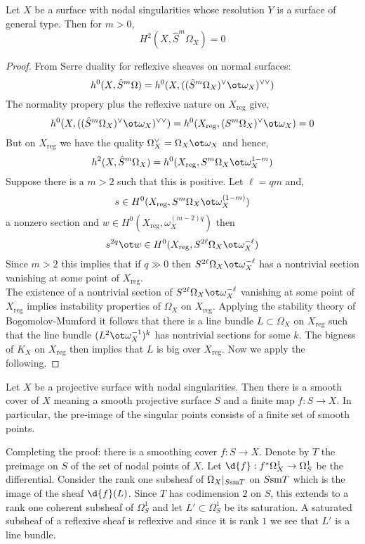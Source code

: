 \documentclass[12pt]{article}
\begin{document}
\newcommand{\reg}{\mathrm{reg}}

\begin{prop}
Let $X$ be a surface with nodal singularities whose resolution $Y$ is a surface of general type. Then for $m > 0$,
\[ H^2(X, \hat{S}^m \Omega_X) = 0 \]
\end{prop}

\begin{proof}
From Serre duality for reflexive sheaves on normal surfaces:
\[ h^0(X, \hat{S}^m \Omega) = h^0(X, ((\hat{S}^m \Omega_X)^\vee \ot \omega_X)^{\vee \vee}) \]
The normality propery plus the reflexive nature on $X_{\reg}$ give,
\[ h^0(X, ((\hat{S}^m \Omega_X)^\vee \ot \omega_X)^{\vee \vee}) = h^0(X_{\reg}, (S^m \Omega_X)^\vee \ot \omega_X) = 0 \]
But on $X_{\reg}$ we have the quality $\Omega_X^\vee = \Omega_X \ot \omega_X$ and hence,
\[ h^2(X, \hat{S}^m \Omega_X) = h^0(X_{\reg}, S^m \Omega_X \ot \omega_X^{1-m}) \]
Suppose there is a $m > 2$ such that this is positive. Let $\ell = qm$ and,
\[ s \in H^0(X_{\reg}, S^m \Omega_X \ot \omega_X^{(1 - m)}) \]
a nonzero section and $w \in H^0(X_{\reg}, \omega_X^{(m-2)q})$ then
\[ s^{2q} \ot w \in H^0(X_{\reg}, S^{2 \ell} \Omega_X \ot \omega_X^{-\ell}) \]
Since $m > 2$ this implies that if $q \gg 0$ then $S^{2 \ell} \Omega_X \ot \omega_X^{-\ell}$ has a nontrivial section vanishing at some point of $X_{\reg}$. 
\bigskip\\
The existence of a nontrivial section of $S^{2 \ell} \Omega_X \ot \omega_X^{-\ell}$ vanishing at some point of $X_{\reg}$ implies instability properties of $\Omega_X$ on $X_{\reg}$. Applying the stability theory of Bogomolov-Mumford it follows that there is a line bundle $L \subset \Omega_X$ on $X_{\reg}$ such that the line bundle $(L^2 \ot \omega_X^{-1})^k$ has nontrivial sections for some $k$. The bigness of $K_X$ on $X_{\reg}$ then implies that $L$ is big over $X_{\reg}$. Now we apply the following.
\end{proof}

\begin{lemma}
Let $X$ be a projective surface with nodal singularities. Then there is a smooth cover of $X$ meaning a smooth projective surface $S$ and a finite map $f : S \to X$. In particular, the pre-image of the singular points consists of a finite set of smooth points. 
\end{lemma}


Completing the proof: there is a smoothing cover $f : S \to X$. Denote by $T$ the preimage on $S$ of the set of nodal points of $X$. Let $\d{f} : f^* \Omega_X^1 \to \Omega_S^1$ be the differential. Consider the rank one subsheaf of $\Omega_{X}|_{S\mathrm{sm} T}$ on $S \mathrm{sm} T$ which is the image of the sheaf $\d{f}(L)$. Since $T$ has codimension $2$ on $S$, this extends to a rank one coherent subsheaf of $\Omega_S^1$ and let $L' \subset \Omega_S^1$ be its saturation. A saturated subsheaf of a reflexive sheaf is reflexive and since it is rank $1$ we see that $L'$ is a line bundle.
\end{document}
